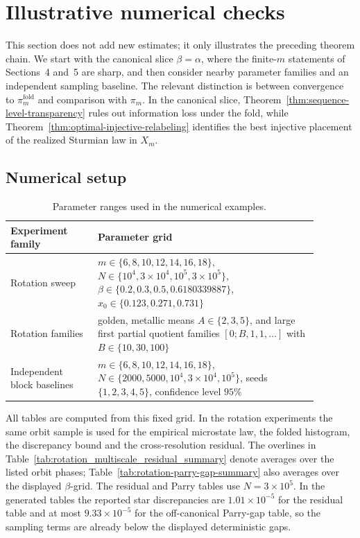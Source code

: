 \section{Illustrative numerical checks}

This section does not add new estimates; it only illustrates the preceding
theorem chain.  We start with
the canonical slice \(\beta=\alpha\), where the finite-\(m\) statements of
Sections~4 and~5 are sharp, and then consider nearby parameter families and an
independent sampling baseline.  The relevant distinction is between
convergence to \(\pi_m^{\mathrm{fold}}\) and comparison with \(\pi_m\).  In
the canonical slice, Theorem~\ref{thm:sequence-level-transparency} rules out
information loss under the fold, while
Theorem~\ref{thm:optimal-injective-relabeling} identifies the best injective
placement of the realized Sturmian law in \(X_m\).

\subsection{Numerical setup}

\begin{table}[t]
\centering
\small
\begin{tabular}{>{\raggedright\arraybackslash}p{0.25\linewidth} >{\raggedright\arraybackslash}p{0.63\linewidth}}
\toprule
Experiment family & Parameter grid \\
\midrule
Rotation sweep &
$m\in\{6,8,10,12,14,16,18\}$,
$N\in\{10^4,3\times 10^4,10^5,3\times 10^5\}$,
$\beta\in\{0.2,0.3,0.5,0.6180339887\}$,
$x_0\in\{0.123,0.271,0.731\}$ \\
Rotation families &
golden, metallic means $A\in\{2,3,5\}$, and large first partial quotient
families $[0;B,1,1,\dots]$ with $B\in\{10,30,100\}$ \\
Independent block baselines &
$m\in\{6,8,10,12,14,16,18\}$,
$N\in\{2000,5000,10^4,3\times 10^4,10^5\}$,
seeds $\{1,2,3,4,5\}$, confidence level $95\%$ \\
\bottomrule
\end{tabular}
\caption{Parameter ranges used in the numerical examples.}
\label{tab:parameter-grid}
\end{table}

All tables are computed from this fixed grid.  In the rotation experiments the
same orbit sample is used for the empirical microstate law, the folded
histogram, the discrepancy bound and the cross-resolution residual.  The
overlines in Table~\ref{tab:rotation_multiscale_residual_summary} denote
averages over the listed orbit phases; Table~\ref{tab:rotation-parry-gap-summary}
also averages over the displayed \(\beta\)-grid.  The residual and Parry tables
use \(N=3\times 10^5\).  In the generated tables the reported star
discrepancies are \(1.01\times10^{-5}\) for the residual table and at most
\(9.33\times10^{-5}\) for the off-canonical Parry-gap table, so the sampling
terms are already below the displayed deterministic gaps.

